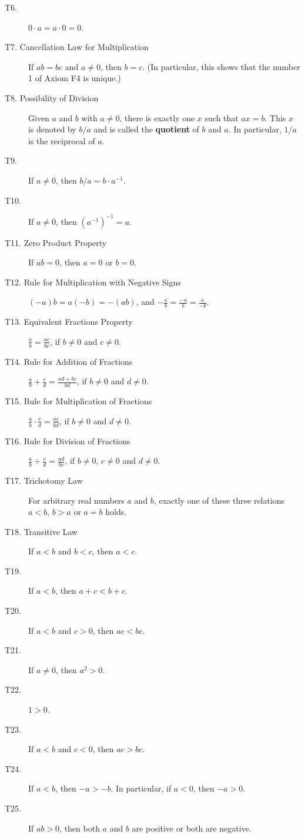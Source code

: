 \documentclass{article}
\begin{document}
\begin{multicols*}{2}
\begin{description}
        \item[T6.]$0\cdot a=a\cdot0=0$.
        \item[T7. Cancellation Law for Multiplication] If $ab=bc$ and $a\neq0$, then $b=c$. (In particular, this shows that the number 1 of Axiom F4 is unique.)
        \item[T8. Possibility of Division]Given $a$ and $b$ with $a\neq0$, there is exactly one $x$ such that $ax=b$. This $x$ is denoted by $b/a$ and is called the \textbf{quotient} of $b$ and $a$. In particular, $1/a$ is the reciprocal of $a$.
        \item[T9.]If $a\neq0$, then $b/a=b\cdot a^{-1}$.
        \item[T10.]If $a\neq0$, then $(a^{-1})^{-1}=a$.
        \item[T11. Zero Product Property]If $ab=0$, then $a=0$ or $b=0$. 
        \item[T12. Rule for Multiplication with Negative Signs]$(-a)b=a(-b)=-(ab)$, and $-\frac{a}{b}=\frac{-a}{b}=\frac{a}{-b}$.
        \item[T13. Equivalent Fractions Property]$\frac{a}{b}=\frac{ac}{bc}$, if $b\neq0$ and $c\neq0$.
        \item[T14. Rule for Addition of Fractions]$\frac{a}{b}+\frac{c}{d}=\frac{ad+bc}{bd}$, if $b\neq0$ and $d\neq0$.
        \item[T15. Rule for Multiplication of Fractions]$\frac{a}{b}\cdot\frac{c}{d}=\frac{ac}{bd}$, if $b\neq0$ and $d\neq0$.
        \item[T16. Rule for Division of Fractions]$\frac{a}{b}\div\frac{c}{d}=\frac{ad}{bc}$, if $b\neq0$, $c\neq0$ and $d\neq0$.
        \item[T17. Trichotomy Law]For arbitrary real numbers $a$ and $b$, exactly one of these three relations $a<b$, $b>a$ or $a=b$ holds. 
        \item[T18. Transitive Law]If $a<b$ and $b<c$, then $a<c$.
        \item[T19.]If $a<b$, then $a+c<b+c$.
        \item[T20.]If $a<b$ and $c>0$, then $ac<bc$.
        \item[T21.]If $a\neq0$, then $a^2>0$.
        \item[T22.]$1>0$.
        \item[T23.]If $a<b$ and $c<0$, then $ac>bc$.
        \item[T24.]If $a<b$, then $-a>-b$. In particular, if $a<0$, then $-a>0$.
        \item[T25.]If $ab>0$, then both $a$ and $b$ are positive or both are negative.

\end{description}
\end{multicols*}
\end{document}
